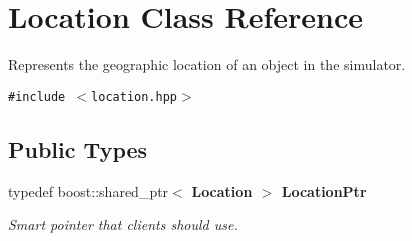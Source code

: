 \section{Location Class Reference}
\label{classLocation}
Represents the geographic location of an object in the simulator.  


{\tt \#include $<$location.hpp$>$}

\subsection*{Public Types}
\begin{CompactItemize}
\item 
typedef boost::shared\_\-ptr$<$ \bf{Location} $>$ \bf{Location\-Ptr}\label{classLocation_52c6ff0b7b0364451af4c32d4a53020b}

\begin{CompactList}\small\item\em Smart pointer that clients should use. \item\end{CompactList}\end{CompactItemize}
